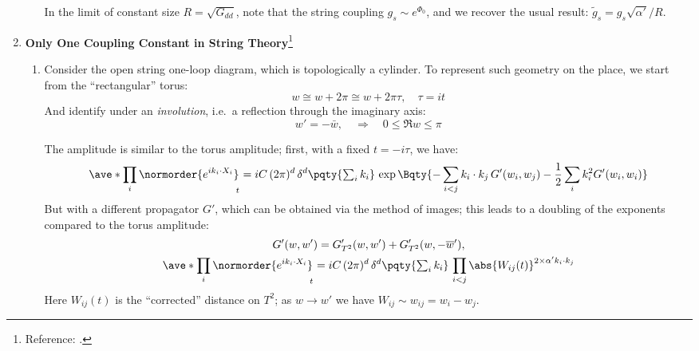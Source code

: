 \documentclass[a4paper,10pt]{article}
\begin{document}
\begin{enumerate}
\begin{enumerate}
	In the limit of constant size $R = \sqrt{G_{dd}}$, note that the string coupling $g_s \sim e^{\Phi_0}$, and we recover the usual result: $\tilde{g}_s = g_s \sqrt{\alpha'} / R$. 
	
	\end{enumerate}
	
	\item \textbf{Only One Coupling Constant in String Theory}\footnote{
		Reference: . 
	}
	\begin{enumerate}
	\item Consider the open string one-loop diagram, which is topologically a cylinder. To represent such geometry on the place, we start from the ``rectangular'' torus:
	\begin{equation}
		w \cong w + 2\pi \cong w + 2\pi\tau,\quad
		\tau = it
	\end{equation}
	And identify under an \textit{involution}, i.e.\ a reflection through the imaginary axis:
	\begin{equation}
		w' = -\bar{w},
	\quad\Longrightarrow\quad
		0 \le \Re w \le \pi
	\end{equation}
	
	The amplitude is similar to the torus amplitude; first, with a fixed $t = -i\tau$, we have:
	\begin{equation}
		\ave*{
			\prod_i \normorder{e^{ik_i\cdot X_i}}
		}_{\!\!t}
		= iC\, (2\pi)^d\,
			\delta^d\pqty{\textstyle\sum_i k_i}\,
			\exp \Bqty{
				- \sum_{i<j} k_i\cdot k_j\,
					G'(w_i,w_j)
				- \frac{1}{2} \sum_{i} k_i^2
					G'(w_i,w_i)
			}
	\label{eq:amp_generic}
	\end{equation}
	But with a different propagator $G'$, which can be obtained via the method of images; this leads to a doubling of the exponents compared to the torus amplitude:
	\begin{gather}
		G'(w,w')
		= G'_{T^2}(w,w')
			+ G'_{T^2}(w,-\bar{w}'),
	\\
		\ave*{
			\prod_i \normorder{e^{ik_i\cdot X_i}}
		}_{\!\!t}
		= iC\, (2\pi)^d\,
			\delta^d\pqty{\textstyle\sum_i k_i}\,
			\prod_{i < j}
				\abs{W_{ij}(t)}^{
					2\times \alpha'k_i\cdot k_j
				}
	\end{gather}
	Here $W_{ij}(t)$ is the ``corrected'' distance on $T^2$; as $w\to w'$ we have $W_{ij}\sim w_{ij} = w_i - w_j$. 
	

\end{enumerate}
\end{enumerate}
\end{document}
